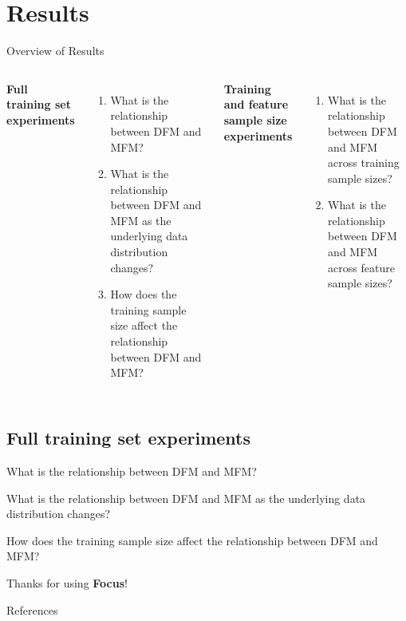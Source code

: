 \documentclass{beamer}
\begin{document}
\section{Results}
\begin{frame}{Overview of Results}
  \begin{columns}[t]
    \begin{center}
      \textbf{Full training set experiments}
    \end{center}
    \begin{enumerate}
    \item What is the relationship between DFM and MFM?
    \item What is the relationship between DFM and MFM as the
      underlying data distribution changes?
    \item How does the training sample size affect the relationship
      between DFM and MFM?
    \end{enumerate}
    \begin{center}
      \textbf{Training and feature sample size experiments}
    \end{center}
    \begin{enumerate}
    \item What is the relationship between DFM and MFM across training
      sample sizes?
    \item What is the relationship between DFM and MFM across
      feature sample sizes?
    \end{enumerate}
  \end{columns}
\end{frame}

\subsection{Full training set experiments}
\begin{frame}{What is the relationship between DFM and MFM?}
  
\end{frame}

\begin{frame}{What is the relationship between DFM and MFM as the
    underlying data distribution changes?}
  
\end{frame}

\begin{frame}{How does the training sample size affect the
    relationship between DFM and MFM?}
  
\end{frame}
\begin{frame}[focus]
  Thanks for using \textbf{Focus}!
\end{frame}

\appendix
\begin{frame}{References}
  \nocite{*}
  
  
\end{frame}
\end{document}
